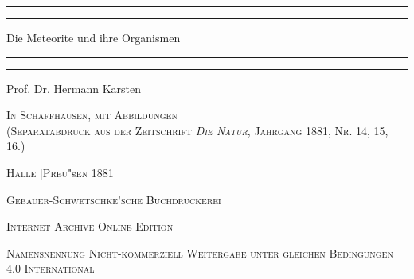 \documentclass[a4paper, 11pt, oneside]{article}
\begin{document}
\swabfamily
\renewcommand{\contentsname}{
\swabfamily{Inhaltsverzeichnis}
}
\begin{titlepage} %
	\centering %

	
	\rule{\textwidth}{1.6pt}\vspace*{-\baselineskip}\vspace*{2pt} %
	\rule{\textwidth}{0.4pt} %
	
	\vspace{1.5\baselineskip} %
	
	{\Huge Die Meteorite und ihre Organismen}
	
	\vspace{1\baselineskip} %

	\rule{\textwidth}{0.4pt}\vspace*{-\baselineskip}\vspace{3.2pt} %
	\rule{\textwidth}{1.6pt} %
	
	\vspace{1\baselineskip} %
	
	
	{\large Prof. Dr. Hermann Karsten} %
	
	\vspace*{1\baselineskip} %
	
    {\scshape\small In Schaffhausen, mit Abbildungen\\ (Separatabdruck aus der Zeitschrift \emph{Die Natur}, Jahrgang 1881, Nr. 14, 15, 16.)} %
    
    \vspace*{\fill}

	\vspace{1\baselineskip}

	{\small\scshape Halle [Preu}\small "s{\small\scshape en 1881]}
	
	{\small\scshape{Gebauer-Schwetschke'sche Buchdruckerei}}
	
	\vspace{0.5\baselineskip} %

    \scshape Internet Archive Online Edition  %
	
	{\scshape\small Namensnennung Nicht-kommerziell Weitergabe unter gleichen Bedingungen 4.0 International} %
\end{titlepage}
\setlength{\parskip}{1mm plus1mm minus1mm}
\clearpage
\tableofcontents
\clearpage
\LARGE
\pagestyle{fancy}
\fancyhf{}
\cfoot{\swabfamily{\thepage}}
\end{document}
